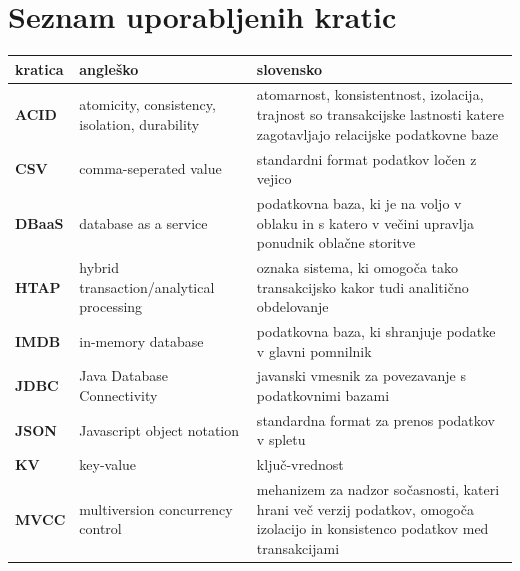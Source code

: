 \documentclass[a4paper, 12pt]{book}
\newcommand{\clearemptydoublepage}{\newpage{\pagestyle{empty}\cleardoublepage}}
\begin{document}
\vspace{2cm}


\clearemptydoublepage


\pagestyle{empty}
\def\thepage{}%
\tableofcontents{}


\clearemptydoublepage


\chapter*{Seznam uporabljenih kratic}  %

\noindent\begin{longtable}{p{}|p{}|p{}}
    {\bf kratica} & {\bf angleško}
        & {\bf slovensko}
        \\ \hline
    {\bf ACID}  & atomicity, consistency, isolation, durability
        & atomarnost, konsistentnost, izolacija, trajnost so transakcijske lastnosti katere zagotavljajo relacijske podatkovne baze
        \\
    {\bf CSV}   & comma-seperated value
        & standardni format podatkov ločen z vejico
        \\
    {\bf DBaaS}   & database as a service
        & podatkovna baza, ki je na voljo v oblaku in s katero v večini upravlja ponudnik oblačne storitve 
        \\
    {\bf HTAP}  & hybrid transaction/analytical processing
        & oznaka sistema, ki omogoča tako transakcijsko kakor tudi analitično obdelovanje
        \\
    {\bf IMDB}  & in-memory database
        & podatkovna baza, ki shranjuje podatke v glavni pomnilnik
        \\
    {\bf JDBC}  & Java Database Connectivity
        & javanski vmesnik za povezavanje s podatkovnimi bazami
        \\
    {\bf JSON}  & Javascript object notation
        &  standardna format za prenos podatkov v spletu\\
    {\bf KV}    & key-value
        & ključ-vrednost \\
    {\bf MVCC}    & multiversion concurrency control
        & mehanizem za nadzor sočasnosti, kateri hrani več verzij podatkov, omogoča izolacijo in konsistenco podatkov med transakcijami \\

\end{longtable}
\end{document}
